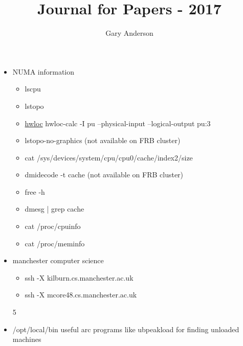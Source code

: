\documentclass[hyperref]{labbook}
\begin{document}
\frontmatter

\title{Journal for Papers  - 2017}
\author{Gary Anderson }
\maketitle

\printindex
\tableofcontents

\mainmatter


\begin{itemize}
\item NUMA information
  \begin{itemize}
  \item lscpu
  \item lstopo
  \item \href{https://www.open-mpi.org/projects/hwloc/doc/hwloc-v1.11.8-letter.pdf}{hwloc} hwloc-calc -I pu --physical-input --logical-output pu:3
  \item lstopo-no-graphics (not available on FRB cluster)
  \item cat /sys/devices/system/cpu/cpu0/cache/index2/size
  \item dmidecode -t cache  (not available on FRB cluster)
  \item free -h
  \item dmesg | grep cache
  \item cat /proc/cpuinfo
  \item cat /proc/meminfo
  \end{itemize}

\end{itemize}


\begin{itemize}
\item manchester computer science
  \begin{itemize}
  \item ssh -X kilburn.cs.manchester.ac.uk
  \item ssh -X mcore48.cs.manchester.ac.uk
  \end{itemize}
5
\end{itemize}

\begin{itemize}
\item /opt/local/bin   useful arc programs like ubpeakload for finding unloaded machines
\end{itemize}
\end{document}
